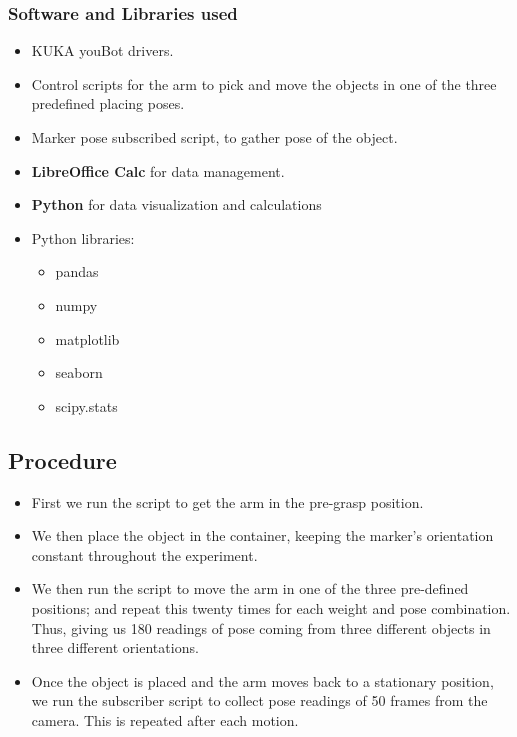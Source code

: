 \documentclass[10pt,a4paper]{article}
\begin{document}
					\subsubsection{Software and Libraries used}
						\begin{itemize}
							\item KUKA youBot drivers.
							\item Control scripts for the arm to pick and move the objects in one of the three predefined placing poses.
							\item Marker pose subscribed script, to gather pose of the object.
							\item \textbf{LibreOffice Calc} for data management.
							\item \textbf{Python} for data visualization and calculations
							\item Python libraries:
							\begin{itemize}
								\item pandas
								\item numpy
								\item matplotlib
								\item seaborn
								\item scipy.stats
							\end{itemize}
							\end{itemize}		
											
				\subsection{Procedure}	
					\begin{itemize}
						\item First we run the script to get the arm in the pre-grasp position.
						\item We then place the object in the container, keeping the marker's orientation constant throughout the experiment.\\
						\item We then run the script to move the arm in one of the three pre-defined positions; and repeat this twenty times for each weight and pose combination. Thus, giving us 180 readings of pose coming from three different objects in three different orientations.
						\item Once the object is placed and the arm moves back to a stationary position, we run the subscriber script to collect pose readings of 50 frames from the camera. This is repeated after each motion.
					\end{itemize}
\end{document}
